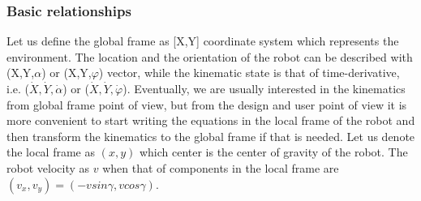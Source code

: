 \documentclass[12pt,english,twoside]{article}
\begin{document}
\subsubsection{Basic relationships}
Let us define the global frame as [X,Y] coordinate system which represents the environment. The location and the orientation of the robot can be described with (X,Y,$\alpha$) or (X,Y,$\varphi$) vector, while the kinematic state is that of time-derivative, i.e. ($\dot X, \dot Y, \dot \alpha$) or ($\dot X, \dot Y, \dot \varphi$). Eventually, we are usually interested in the kinematics from global frame point of view, but from the design and user point of view it is more convenient to start writing the equations in the local frame of the robot and then transform the kinematics to the global frame if that is needed. Let us denote the local frame as $(x,y)$ which center is the center of gravity of the robot. The robot velocity as $v$ when that of components in the local frame are $(v_x,v_y) = (- v sin \gamma , v cos \gamma )$.
\end{document}
